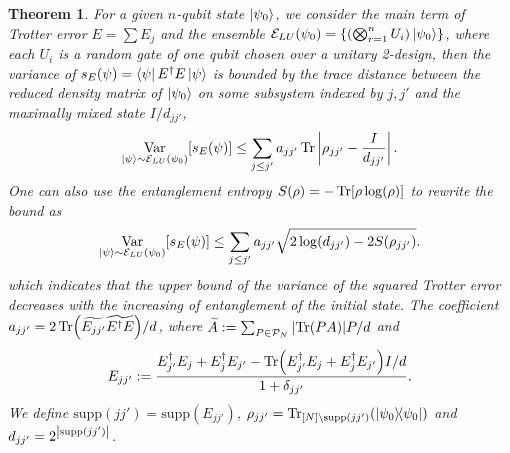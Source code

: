 \documentclass[showpacs,amsmath,amssymb,twocolumn,aps,pra,superscriptaddress,notitlepage,10pt]{revtex4-2}
\newcommand{\cP}{\mathcal P}
\newcommand{\cE}{\mathcal E_{LU}}
\newcommand{\supp}{\mathrm{supp}}
\newtheorem{theorem}{Theorem}
\begin{document}
\begin{theorem}\label{theo:var-ent}
    For a given $n$-qubit state $\ket{\psi_0}$, we consider the main term of Trotter error $E=\sum E_j$ and the ensemble $\cE(\psi_0)=\{(\bigotimes_{r=1}^nU_i)\ket{\psi_0}\}$, where each $U_i$ is a random gate of one qubit chosen over a unitary 2-design, then the variance of $s_E(\psi)=\bra{\psi}E^\dagger E\ket{\psi}$ is bounded by the trace distance between the reduced density matrix of $\ket{\psi_0}$ on some subsystem indexed by $j,j'$ and the maximally mixed state $I/d_{jj'}$,
    \begin{align}
        \mathop{\mathrm{Var}}_{\ket{\psi}\sim\cE(\psi_0)}[s_E(\psi)] \leq \sum_{j\le j'}a_{jj'}\Tr\left|\rho_{jj'}-\frac{I}{d_{jj'}}\right|.
    \end{align}
    One can also use the entanglement entropy $S(\rho)=-\Tr[\rho\log(\rho)]$ to rewrite the bound as
    \begin{align}
        \mathop{\mathrm{Var}}_{\ket{\psi}\sim\cE(\psi_0)}[s_E(\psi)] \leq \sum_{j\le j'}a_{jj'}\sqrt{2\log(d_{jj'})-2S(\rho_{jj'})}.
    \end{align}
    which indicates that the upper bound of the variance of the squared Trotter error decreases with the increasing of entanglement of the initial state.
    The coefficient $a_{jj'}=2\Tr(\widetilde{E_{jj'}}\widetilde{E^\dagger E})/d$, where $\widetilde A:=\sum_{P\in\cP_N}\abs{\Tr(PA)}P/d$ and
    \begin{equation}
        E_{jj'}:=\frac{E_{j'}^\dagger E_j+E_j^\dagger E_{j'}-\Tr(E_{j'}^\dagger E_j+E_j^\dagger E_{j'})I/d}{1+\delta_{jj'}}.\label{equ: Ejj'}
    \end{equation}
    We define $\supp(jj')=\supp(E_{jj'})$, $\rho_{jj'}=\Tr_{[N]\setminus\supp(jj')}(\ketbra{\psi_0}{\psi_0})$ and $d_{jj'}=2^{\abs{\supp(jj')}}$.
\end{theorem}
\end{document}
